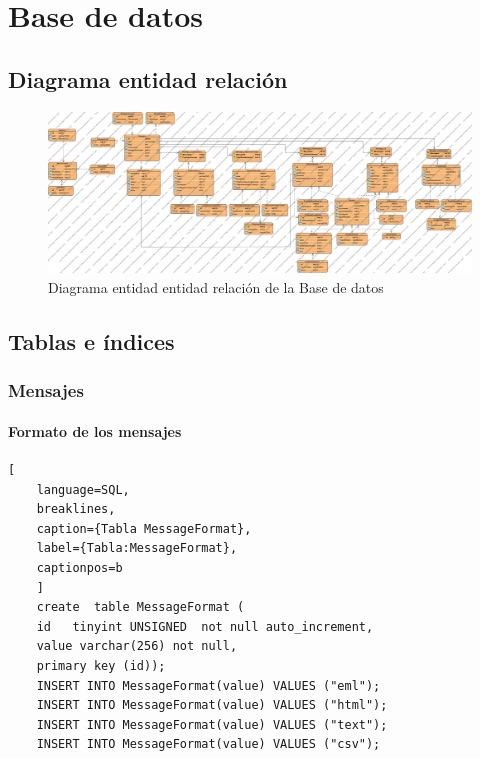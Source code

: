 \chapter{Base de datos}
\section{Diagrama entidad relación}


\begin{figure}[H]
    \centering
    \includegraphics[scale=0.2, angle=90]{imagenes/Diagrama_entidad_relacion.png}
\caption{Diagrama entidad entidad relación de la Base de datos}
\end{figure}



\section{Tablas e índices}
\renewcommand{\lstlistingname}{Tabla}%

\subsection{Mensajes}
\subsubsection{Formato de los mensajes}
\begin{lstlisting}[
    language=SQL,
    breaklines, 
    caption={Tabla MessageFormat}, 
    label={Tabla:MessageFormat}, 
    captionpos=b
    ]
    create  table MessageFormat (
    id   tinyint UNSIGNED  not null auto_increment, 
    value varchar(256) not null, 
    primary key (id));
    INSERT INTO MessageFormat(value) VALUES ("eml");
    INSERT INTO MessageFormat(value) VALUES ("html");
    INSERT INTO MessageFormat(value) VALUES ("text");
    INSERT INTO MessageFormat(value) VALUES ("csv");
\end{lstlisting}

